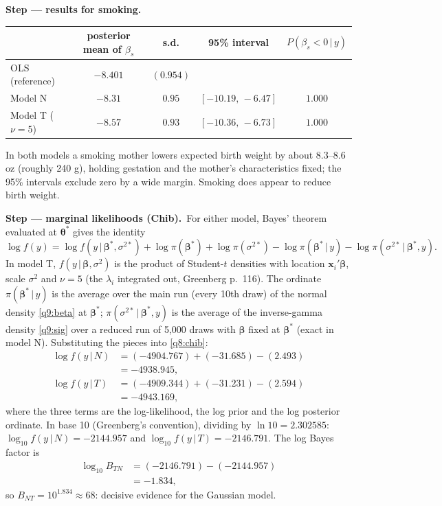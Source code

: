 \documentclass[11pt,a4paper]{article}
\numberwithin{equation}{questao}
\newcommand{\passo}[2]{\par\smallskip\noindent\textbf{Step --- #1.}~#2}
\begin{document}
\begin{sol}
\passo{results for smoking}{
\begin{center}\small
\begin{tabular}{lcccc}
\toprule
 & posterior mean of $\beta_s$ & s.d. & 95\% interval & $P(\beta_s<0\,|\,y)$\\
\midrule
OLS (reference) & $-8.401$ & $(0.954)$ & & \\
Model N & $-8.31$ & $0.95$ & $[-10.19,\,-6.47]$ & $1.000$\\
Model T ($\nu=5$) & $-8.57$ & $0.93$ & $[-10.36,\,-6.73]$ & $1.000$\\
\bottomrule
\end{tabular}
\end{center}
In both models a smoking mother lowers expected birth weight by about $8.3$--$8.6$ oz (roughly 240 g),
holding gestation and the mother's characteristics fixed; the 95\% intervals exclude zero by a wide
margin. Smoking does appear to reduce birth weight.}

\passo{marginal likelihoods (Chib)}{For either model, Bayes' theorem evaluated at $\boldsymbol\theta^*$ gives the identity
\begin{equation}
\log f(y)=\log f(y\,|\,\boldsymbol\beta^*,\sigma^{2*})+\log\pi(\boldsymbol\beta^*)+\log\pi(\sigma^{2*})-\log\pi(\boldsymbol\beta^*\,|\,y)-\log\pi(\sigma^{2*}\,|\,\boldsymbol\beta^*,y). \label{q8:chib}
\end{equation}
In model T, $f(y\,|\,\boldsymbol\beta,\sigma^2)$ is the product of Student-$t$ densities with location
$\mathbf{x}_i'\boldsymbol\beta$, scale $\sigma^2$ and $\nu=5$ (the $\lambda_i$ integrated out, Greenberg p.~116).
The ordinate $\pi(\boldsymbol\beta^*\,|\,y)$ is the average over the main run (every 10th draw) of the
normal density \eqref{q9:beta} at $\boldsymbol\beta^*$; $\pi(\sigma^{2*}\,|\,\boldsymbol\beta^*,y)$ is the average of
the inverse-gamma density \eqref{q9:sig} over a reduced run of 5{,}000 draws with $\boldsymbol\beta$ fixed at
$\boldsymbol\beta^*$ (exact in model N). Substituting the pieces into \eqref{q8:chib}:
\begin{align*}
\log f(y\,|\,N)&=(-4904.767)+(-31.685)-(2.493)\\
&=-4938.945,\\
\log f(y\,|\,T)&=(-4909.344)+(-31.231)-(2.594)\\
&=-4943.169,
\end{align*}
where the three terms are the log-likelihood, the log prior and the log posterior ordinate. In base 10
(Greenberg's convention), dividing by $\ln10=2.302585$:
$\log_{10}f(y\,|\,N)=-2144.957$ and $\log_{10}f(y\,|\,T)=-2146.791$. The log Bayes factor is
\begin{align*}
\log_{10}B_{TN}&=(-2146.791)-(-2144.957)\\
&=-1.834,
\end{align*}
so $B_{NT}=10^{1.834}\approx68$: decisive evidence for the Gaussian model.}


\end{sol}
\end{document}
